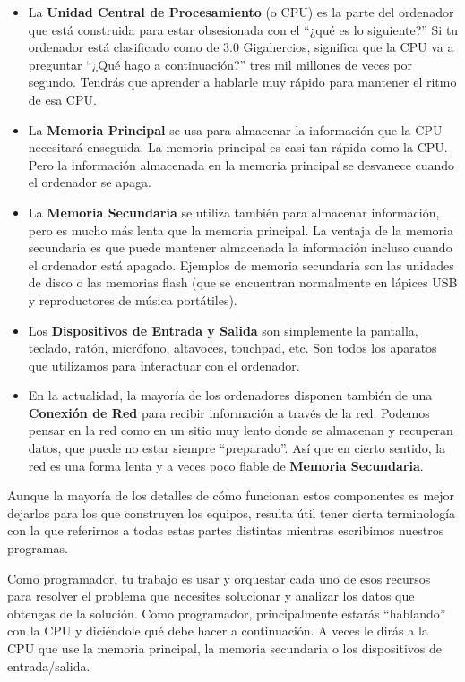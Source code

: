\begin{itemize}

\item La {\bf Unidad Central de Procesamiento} (o CPU) es
la parte del ordenador que está construida para estar obsesionada
con el ``¿qué es lo siguiente?'' Si tu ordenador está clasificado
como de 3.0 Gigahercios, significa que la CPU va a preguntar ``¿Qué hago a continuación?''
tres mil millones de veces por segundo. Tendrás que aprender a hablarle muy
rápido para mantener el ritmo de esa CPU.

\item La {\bf Memoria Principal} se usa para almacenar la información
que la CPU necesitará enseguida. La memoria principal es casi
tan rápida como la CPU. Pero la información almacenada en la memoria
principal se desvanece cuando el ordenador se apaga.

\item La {\bf Memoria Secundaria} se utiliza también para almacenar
información, pero es mucho más lenta que la memoria principal.
La ventaja de la memoria secundaria es que puede mantener
almacenada la información incluso cuando el ordenador está apagado.
Ejemplos de memoria secundaria son las unidades de disco o las
memorias flash (que se encuentran normalmente en lápices USB y
reproductores de música portátiles).

\item Los {\bf Dispositivos de Entrada y Salida} son simplemente
la pantalla, teclado, ratón, micrófono, altavoces, touchpad, etc.
Son todos los aparatos que utilizamos para interactuar con el ordenador.

\item En la actualidad, la mayoría de los ordenadores disponen también de una
{\bf Conexión de Red} para recibir información a través de la red.
Podemos pensar en la red como en un sitio muy lento donde se almacenan
y recuperan datos, que puede no estar siempre ``preparado''. Así que en cierto sentido,
la red es una forma lenta y a veces poco fiable de
{\bf Memoria Secundaria}.

\end{itemize}

Aunque la mayoría de los detalles de cómo funcionan estos componentes es mejor
dejarlos para los que construyen los equipos, resulta útil tener cierta terminología
con la que referirnos a todas estas partes distintas mientras escribimos nuestros programas.

Como programador, tu trabajo es usar y orquestar cada uno de esos
recursos para resolver el problema que necesites solucionar
y analizar los datos que obtengas de la solución. Como programador, principalmente
estarás ``hablando'' con la CPU y diciéndole qué debe hacer a continuación.
A veces le dirás a la CPU que use la memoria principal,
la memoria secundaria o los dispositivos de entrada/salida.

